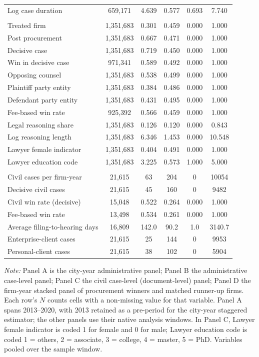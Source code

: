 \begin{table}[!htbp]
\begin{threeparttable}
\begin{tabular}{lccccc}
Log case duration & 659,171 & 4.639 & 0.577 & 0.693 & 7.740 \\
\addlinespace
\multicolumn{6}{l}{\textit{Panel C. Civil case-level (document-level) panel}} \\
Treated firm & 1,351,683 & 0.301 & 0.459 & 0.000 & 1.000 \\
Post procurement & 1,351,683 & 0.667 & 0.471 & 0.000 & 1.000 \\
Decisive case & 1,351,683 & 0.719 & 0.450 & 0.000 & 1.000 \\
Win in decisive case & 971,341 & 0.589 & 0.492 & 0.000 & 1.000 \\
Opposing counsel & 1,351,683 & 0.538 & 0.499 & 0.000 & 1.000 \\
Plaintiff party entity & 1,351,683 & 0.384 & 0.486 & 0.000 & 1.000 \\
Defendant party entity & 1,351,683 & 0.431 & 0.495 & 0.000 & 1.000 \\
Fee-based win rate & 925,392 & 0.566 & 0.459 & 0.000 & 1.000 \\
Legal reasoning share & 1,351,683 & 0.126 & 0.120 & 0.000 & 0.843 \\
Log reasoning length & 1,351,683 & 6.346 & 1.453 & 0.000 & 10.548 \\
Lawyer female indicator & 1,351,683 & 0.404 & 0.491 & 0.000 & 1.000 \\
Lawyer education code & 1,351,683 & 3.225 & 0.573 & 1.000 & 5.000 \\
\addlinespace
\multicolumn{6}{l}{\textit{Panel D. Firm-year stacked panel}} \\
Civil cases per firm-year & 21,615 & 63 & 204 & 0 & 10054 \\
Decisive civil cases & 21,615 & 45 & 160 & 0 & 9482 \\
Civil win rate (decisive) & 15,048 & 0.522 & 0.264 & 0.000 & 1.000 \\
Fee-based win rate & 13,498 & 0.534 & 0.261 & 0.000 & 1.000 \\
Average filing-to-hearing days & 16,809 & 142.0 & 90.2 & 1.0 & 3140.7 \\
Enterprise-client cases & 21,615 & 25 & 144 & 0 & 9953 \\
Personal-client cases & 21,615 & 38 & 102 & 0 & 5904 \\
\bottomrule
\end{tabular}
\begin{tablenotes}[flushleft]
\footnotesize
\item \textit{Note:} Panel A is the city-year administrative panel; Panel B the administrative case-level panel; Panel C the civil case-level (document-level) panel; Panel D the firm-year stacked panel of procurement winners and matched runner-up firms. Each row's $N$ counts cells with a non-missing value for that variable. Panel A spans 2013--2020, with 2013 retained as a pre-period for the city-year staggered estimator; the other panels use their native analysis windows. In Panel C, Lawyer female indicator is coded 1 for female and 0 for male; Lawyer education code is coded 1 = others, 2 = associate, 3 = college, 4 = master, 5 = PhD. Variables pooled over the sample window.

\end{tablenotes}
\end{threeparttable}
\end{table}
